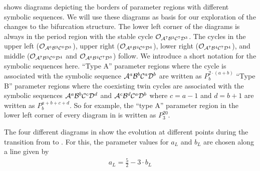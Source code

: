  shows diagrams depicting the borders of parameter regions with different symbolic sequences.
We will use these diagrams as basis for our exploration of the changes to the bifurcation structure.
The lower left corner of the diagrams is always in the period region with the stable cycle $\mathcal{O}_{\mathcal{A}^7\mathcal{B}^3\mathcal{C}^7\mathcal{D}^3}$.
The cycles in the upper left ($\mathcal{O}_{\mathcal{A}^6\mathcal{B}^3\mathcal{C}^6\mathcal{D}^3}$), upper right ($\mathcal{O}_{\mathcal{A}^6\mathcal{B}^4\mathcal{C}^6\mathcal{D}^4}$), lower right ($\mathcal{O}_{\mathcal{A}^7\mathcal{B}^4\mathcal{C}^7\mathcal{D}^4}$), and middle ($\mathcal{O}_{\mathcal{A}^7\mathcal{B}^3\mathcal{C}^6\mathcal{D}^4}$ and $\mathcal{O}_{\mathcal{A}^6\mathcal{B}^4\mathcal{C}^7\mathcal{D}^3}$) follow.
We introduce a short notation for the symbolic sequences here.
``Type A'' parameter regions where the cycle is associated with the symbolic sequence $\mathcal{A}^a\mathcal{B}^b\mathcal{C}^a\mathcal{D}^b$ are written as $P^{2 \cdot \left(a + b\right)}_b$
``Type B'' parameter regions where the coexisting twin cycles are associated with the symbolic sequences $\mathcal{A}^a\mathcal{B}^b\mathcal{C}^c\mathcal{D}^d$ and $\mathcal{A}^c\mathcal{B}^d\mathcal{C}^a\mathcal{D}^b$ where $c = a - 1$ and $d = b + 1$ are written as $P^{a + b + c + d}_b$.
So for example, the ``type A'' parameter region in the lower left corner of every diagram in  is written as $P^{20}_3$.

The four different diagrams in  show the evolution at different points during the transition from  to .
For this, the parameter values for $a_L$ and $b_L$ are chosen along a line given by 
\begin{align}
	a_L = \frac{5}{2} - 3 \cdot b_L
	\label{equ:add.change.paramline}
\end{align}

